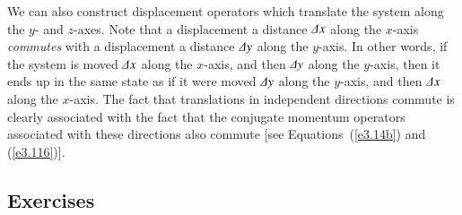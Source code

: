 We can also construct displacement operators which translate the system along
the $y$- and $z$-axes. Note that a displacement a distance ${\mit\Delta} x$ 
along the
$x$-axis {\em commutes} with a displacement a distance ${\mit\Delta} y$ along the
 $y$-axis. 
In other words, if the system is moved ${\mit\Delta} x$ along the $x$-axis, and then
${\mit\Delta} y$ along the $y$-axis, then it ends up in the same state as if it were moved
${\mit\Delta} y$ along the $y$-axis, and then ${\mit\Delta} x$ along the $x$-axis. The fact that
translations in independent directions commute is clearly associated with the
fact that the conjugate momentum operators
 associated with these directions also commute
[see Equations~(\ref{e3.14b}) and (\ref{e3.116})].

\subsection*{Exercises}
